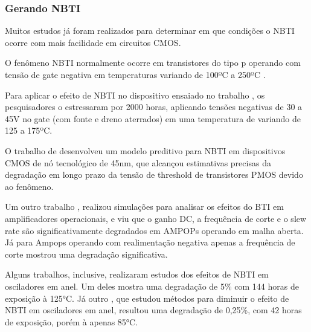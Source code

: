 \subsubsection{Gerando NBTI}
Muitos estudos já foram realizados para determinar em que condições o NBTI ocorre com mais facilidade em circuitos CMOS.

O fenômeno NBTI normalmente ocorre em transistores do tipo p operando com tensão de gate negativa em temperaturas variando de 100ºC a 250ºC \cite{Davidovic}.

Para aplicar o efeito de NBTI no dispositivo ensaiado no trabalho \cite{Davidovic}, os pesquisadores o estressaram por 2000 horas, aplicando tensões negativas de 30 a 45V no gate (com fonte e dreno aterrados) em uma temperatura de variando de 125 a 175ºC.

O trabalho de \cite{Bhardwaj} desenvolveu um modelo preditivo para NBTI em dispositivos CMOS de nó tecnológico de 45nm, que alcançou estimativas precisas da degradação em longo prazo da tensão de threshold de transistores PMOS devido ao fenômeno.

Um outro trabalho \cite{Grossi}, realizou simulações para analisar os efeitos do BTI em amplificadores operacionais, e viu que o ganho DC, a frequência de corte e o slew rate são significativamente degradados em AMPOPs operando em malha aberta. Já para Ampops operando com realimentação negativa apenas a frequência de corte mostrou uma degradação significativa.

Alguns trabalhos, inclusive, realizaram estudos dos efeitos de NBTI em osciladores em anel. Um deles \cite{Lorenz} mostra uma degradação de 5\% com 144 horas de exposição à 125°C. Já outro \cite{Sato}, que estudou métodos para diminuir o efeito de NBTI em osciladores em anel, resultou uma degradação de 0,25\%, com 42 horas de exposição, porém à apenas 85°C.
